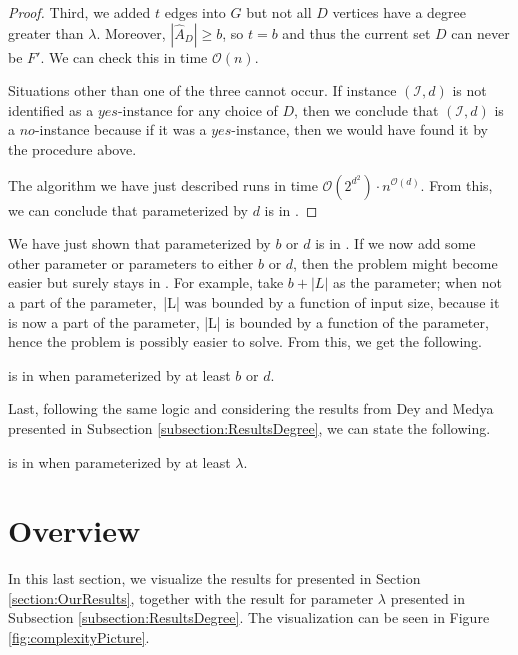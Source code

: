 \begin{proof}
    Third, we added $t$ edges into $G$ but not all $D$ vertices have a degree greater than $\lambda$.
    Moreover, $|\hat{A}_D| \geq b$, so $t = b$ and thus the current set $D$ can never be $F'$.
    We can check this in time $\mathcal{O}(n)$.

    Situations other than one of the three cannot occur.
    If instance $(\mathcal{I}, d)$ is not identified as a $yes$-instance for any choice of $D$,
    then we conclude that $(\mathcal{I}, d)$ is a $no$-instance because if it was a $yes$-instance,
    then we would have found it by the procedure above.
    
    The algorithm we have just described runs in time $\mathcal{O}(2^{d^2}) \cdot n^{\mathcal{O}(d)}$.
    From this, we can conclude that \HL parameterized by $d$ is in \XP.
\end{proof}

We have just shown that \HL parameterized by $b$ or $d$ is in \XP.
If we now add some other parameter or parameters to either $b$ or $d$, then the problem
might become easier but surely stays in \XP.
For example, take $b+|L|$ as the parameter;
when not a part of the parameter,~|L| was bounded by a function of input size,
because it is now a part of the parameter, |L| is bounded by a function of the parameter,
hence the problem is possibly easier to solve.
From this, we get the following.

\begin{corollary}\label{cor:BD:variation:XP}
    \HL is in \XP when parameterized by at least $b$ or $d$.
\end{corollary}

Last, following the same logic and considering the results from Dey and Medya \cite{Dey2019} presented in Subsection \ref{subsection:ResultsDegree},
we can state the following.

\begin{corollary}\label{cor:Ld:variation:FPT}
    \HL is in \XP when parameterized by at least $\lambda$.
\end{corollary}

\section{Overview}

In this last section, we visualize the results for \HLdeg presented in Section \ref{section:OurResults},
together with the result for parameter $\lambda$ presented in Subsection \ref{subsection:ResultsDegree}.
The visualization can be seen in Figure \ref{fig:complexityPicture}.

